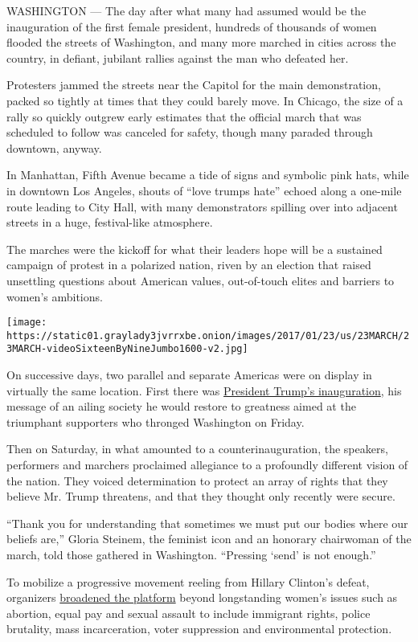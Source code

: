 WASHINGTON --- The day after what many had assumed would be the
inauguration of the first female president, hundreds of thousands of
women flooded the streets of Washington, and many more marched in cities
across the country, in defiant, jubilant rallies against the man who
defeated her.

Protesters jammed the streets near the Capitol for the main
demonstration, packed so tightly at times that they could barely move.
In Chicago, the size of a rally so quickly outgrew early estimates that
the official march that was scheduled to follow was canceled for safety,
though many paraded through downtown, anyway.

In Manhattan, Fifth Avenue became a tide of signs and symbolic pink
hats, while in downtown Los Angeles, shouts of ``love trumps hate''
echoed along a one-mile route leading to City Hall, with many
demonstrators spilling over into adjacent streets in a huge,
festival-like atmosphere.

The marches were the kickoff for what their leaders hope will be a
sustained campaign of protest in a polarized nation, riven by an
election that raised unsettling questions about American values,
out-of-touch elites and barriers to women's ambitions.

\texttt{[image: https://static01.graylady3jvrrxbe.onion/images/2017/01/23/us/23MARCH/23MARCH-videoSixteenByNineJumbo1600-v2.jpg]}

On successive days, two parallel and separate Americas were on display
in virtually the same location. First there was
\href{https://www.nytimes3xbfgragh.onion/2017/01/20/us/politics/trump-inauguration-day.html}{President
Trump's inauguration}, his message of an ailing society he would restore
to greatness aimed at the triumphant supporters who thronged Washington
on Friday.

Then on Saturday, in what amounted to a counterinauguration, the
speakers, performers and marchers proclaimed allegiance to a profoundly
different vision of the nation. They voiced determination to protect an
array of rights that they believe Mr. Trump threatens, and that they
thought only recently were secure.

``Thank you for understanding that sometimes we must put our bodies
where our beliefs are,'' Gloria Steinem, the feminist icon and an
honorary chairwoman of the march, told those gathered in Washington.
``Pressing `send' is not enough.''

To mobilize a progressive movement reeling from Hillary Clinton's
defeat, organizers
\href{https://www.womensmarch.com/principles/}{broadened the platform}
beyond longstanding women's issues such as abortion, equal pay and
sexual assault to include immigrant rights, police brutality, mass
incarceration, voter suppression and environmental protection.

